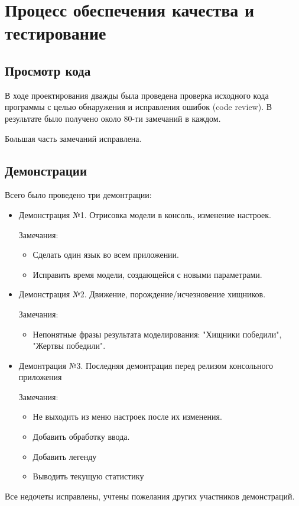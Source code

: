\documentclass[a4paper]{article}
\begin{document}
\section{Процесс обеспечения качества и тестирование}
\subsection{Просмотр кода}
В ходе проектирования дважды была проведена проверка исходного кода программы с целью обнаружения и исправления ошибок (code review). В результате было получено около 80-ти замечаний в каждом.

Большая часть замечаний исправлена. 
\subsection{Демонстрации}
Всего было проведено три демонтрации:
\begin{itemize}

\item Демонстрация №1.
Отрисовка модели в консоль, изменение настроек.

Замечания:

\begin{itemize}
\item Сделать один язык во всем приложении. 
\item Исправить время модели, создающейся с новыми параметрами.
\end{itemize}

\item Демонстрация №2.
Движение, порождение/исчезновение хищников.

Замечания:

\begin{itemize}
\item Непонятные фразы результата моделирования: "Хищники победили", "Жертвы победили".
\end{itemize}

\item Демонтрация №3.
Последняя демонтрация перед релизом консольного приложения

Замечания:

\begin{itemize}
\item Не выходить из меню настроек после их изменения.
\item Добавить обработку ввода.
\item Добавить легенду
\item Выводить текущую статистику
\end{itemize}

\end{itemize} 
Все недочеты исправлены, учтены пожелания других участников демонстраций. 
\end{document}
